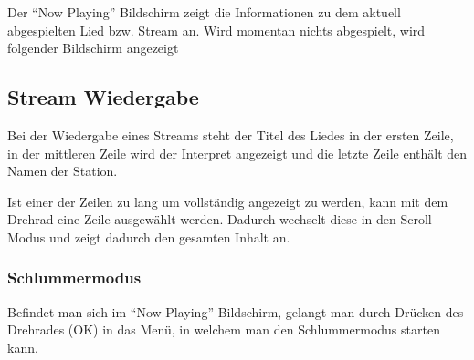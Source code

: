 \documentclass[12pt,a4paper,openany]{memoir}
\begin{document}
Der ``Now Playing'' Bildschirm zeigt die Informationen zu dem aktuell abgespielten Lied bzw. Stream an. Wird momentan nichts abgespielt, wird folgender Bildschirm angezeigt


\subsection{Stream Wiedergabe}

Bei der Wiedergabe eines Streams steht der Titel des Liedes in der ersten Zeile, in der mittleren Zeile wird der Interpret angezeigt und die letzte Zeile enthält den Namen der Station.


Ist einer der Zeilen zu lang um vollständig angezeigt zu werden, kann mit dem Drehrad eine Zeile ausgewählt werden. Dadurch wechselt diese in den Scroll-Modus und zeigt dadurch den gesamten Inhalt an.



\subsubsection{Schlummermodus}
Befindet man sich im ``Now Playing'' Bildschirm, gelangt man durch Drücken des Drehrades (OK) in das Menü, in welchem man den Schlummermodus starten kann.

\end{document}

